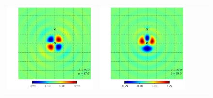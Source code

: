 \documentclass[a4paper,11pt]{article}
\begin{document}
\begin{figure}[t]
\begin{center}
\begin{tabular}{m{8ex}m{}m{}|m{}m{}}
\hspace{\kernelfigspace}\includegraphics[width=\kernelfigwidth]{qu2eb_iker_rad_lat87_lon45.pdf} &
\hspace{\kernelfigspace}\includegraphics[width=\kernelfigwidth]{qu2eb_rker_con_lat87_lon45.pdf} &

\end{tabular}
\end{center}
\end{figure}
\end{document}
